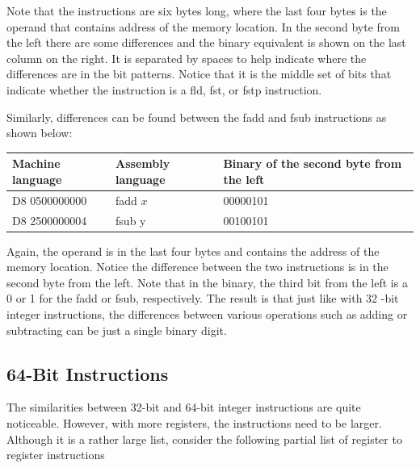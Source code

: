 \documentclass[10pt]{book}
\begin{document}
Note that the instructions are six bytes long, where the last four bytes is the operand that contains address of the memory location. In the second byte from the left there are some differences and the binary equivalent is shown on the last column on the right. It is separated by spaces to help indicate where the differences are in the bit patterns. Notice that it is the middle set of bits that indicate whether the instruction is a fld, fst, or fstp instruction.

Similarly, differences can be found between the fadd and fsub instructions as shown below:

\begin{center}
\begin{tabular}{|l|l|l|}
\hline
Machine language & Assembly language & Binary of the second byte from the left \\
\hline
D8 0500000000 & fadd $x$ & 00000101 \\
\hline
D8 2500000004 & fsub y & 00100101 \\
\hline
\end{tabular}
\end{center}

Again, the operand is in the last four bytes and contains the address of the memory location. Notice the difference between the two instructions is in the second byte from the left. Note that in the binary, the third bit from the left is a 0 or 1 for the fadd or fsub, respectively. The result is that just like with 32 -bit integer instructions, the differences between various operations such as adding or subtracting can be just a single binary digit.

\subsection{64-Bit Instructions}
The similarities between 32-bit and 64-bit integer instructions are quite noticeable. However, with more registers, the instructions need to be larger. Although it is a rather large list, consider the following partial list of register to register instructions
\end{document}
